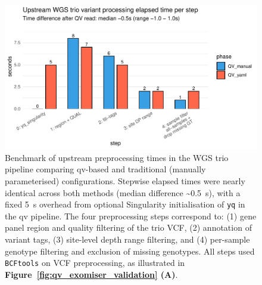 \begin{figure}[h]
\centering
\includegraphics[width=\textwidth]{./images/qv_exomiser/benchmark_preprocess_time_bars_by_step_elapsed.pdf}
\caption{Benchmark of upstream preprocessing times in the WGS trio pipeline comparing \ac{qv}-based and traditional (manually parameterised) configurations. Stepwise elapsed times were nearly identical across both methods (median difference \textasciitilde0.5~s), with a fixed 5~s overhead from optional Singularity initialisation of \texttt{yq} in the \ac{qv} pipeline. The four preprocessing steps correspond to: (1) gene panel region and quality filtering of the trio VCF, (2) annotation of variant tags, (3) site-level depth range filtering, and (4) per-sample genotype filtering and exclusion of missing genotypes. All steps used \texttt{BCFtools} on VCF preprocessing, as illustrated in \textbf{Figure~\ref{fig:qv_exomiser_validation} (A)}.}
\label{fig:benchmark_preprocess_time_bars_by_step_elapsed}
\end{figure}


